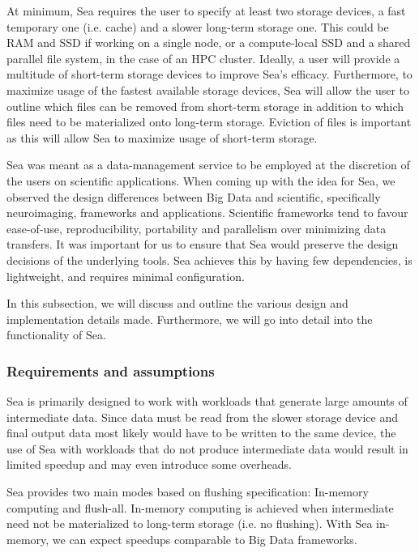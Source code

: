 At minimum, Sea requires the user to specify at least two storage devices, a
fast temporary one (i.e. cache) and a slower long-term storage one. This could be RAM and SSD
if working on a single node, or a compute-local SSD and a shared parallel file
system, in the case of an HPC cluster. Ideally, a user will provide a multitude
of short-term storage devices to improve Sea's efficacy. Furthermore, to
maximize usage of the fastest available storage devices, Sea will allow the user
to outline which files can be removed from short-term storage in addition to
which files need to be materialized onto long-term storage. Eviction of files is
important as this will allow Sea to maximize usage of short-term storage.


Sea was meant as a data-management service to be employed at the discretion of
the users on scientific applications. When coming up with the idea for Sea, we
observed the design differences between Big Data and scientific, specifically
neuroimaging, frameworks and applications. Scientific frameworks tend to favour
ease-of-use, reproducibility, portability and parallelism over minimizing data
transfers. It was important for us to ensure that Sea would preserve the design
decisions of the underlying tools. Sea achieves this by having few dependencies,
is lightweight, and requires minimal configuration.


In this subsection, we will discuss and outline the various design and
implementation details made. Furthermore, we will go into detail into the
functionality of Sea.

\subsubsection{Requirements and assumptions}

Sea is primarily designed to work with workloads that generate large amounts of
intermediate data. Since data must be read from the slower storage device and
final output data most likely would have to be written to the same device, the
use of Sea with workloads that do not produce intermediate data would result in
limited speedup and may even introduce some overheads. 

Sea provides two main modes based on flushing specification: In-memory computing
and flush-all. In-memory computing is achieved when intermediate need not be
materialized to long-term storage (i.e. no flushing). With Sea in-memory, we can
expect speedups comparable to Big Data frameworks.

